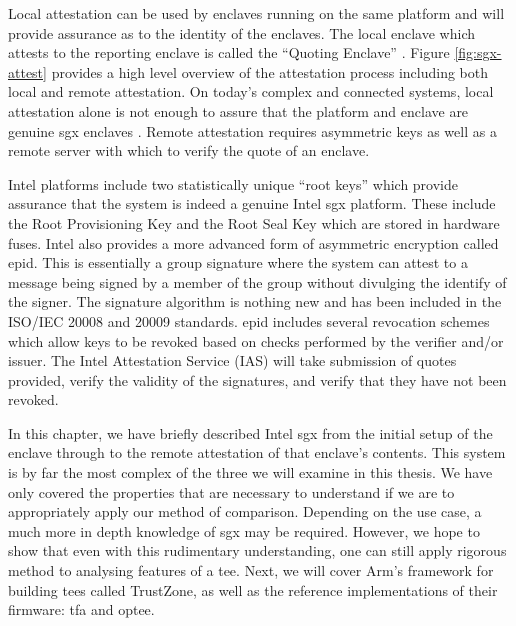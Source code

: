 Local attestation can be used by enclaves running on the same platform and will provide assurance as to the identity of the enclaves. The local enclave which attests to the reporting enclave is called the ``Quoting Enclave'' \cite{johnson2016intel}. Figure \ref{fig:sgx-attest} provides a high level overview of the attestation process including both local and remote attestation. On today's complex and connected systems, local attestation alone is not enough to assure that the platform and enclave are genuine \gls{sgx} enclaves \cite{knauth2018integrating}. Remote attestation requires asymmetric keys as well as a remote server with which to verify the quote of an enclave.

Intel platforms include two statistically unique ``root keys'' which provide assurance that the system is indeed a genuine Intel \gls{sgx} platform. These include the Root Provisioning Key and the Root Seal Key \cite{johnson2016intel} which are stored in hardware fuses. Intel also provides a more advanced form of asymmetric encryption called \gls{epid}. This is essentially a group signature where the system can attest to a message being signed by a member of the group without divulging the identify of the signer. The signature algorithm is nothing new \cite{brickell2007enhanced} and has been included in the ISO/IEC 20008 and 20009 standards. \gls{epid} includes several revocation schemes which allow keys to be revoked based on checks performed by the verifier and/or issuer. The Intel Attestation Service (IAS) will take submission of quotes provided, verify the validity of the signatures, and verify that they have not been revoked.

In this chapter, we have briefly described Intel \gls{sgx} from the initial setup of the enclave through to the remote attestation of that enclave's contents. This system is by far the most complex of the three we will examine in this thesis. We have only covered the properties that are necessary to understand if we are to appropriately apply our method of comparison. Depending on the use case, a much more in depth knowledge of \gls{sgx} may be required. However, we hope to show that even with this rudimentary understanding, one can still apply rigorous method to analysing features of a \gls{tee}. Next, we will cover Arm's framework for building \glspl{tee} called TrustZone, as well as the reference implementations of their firmware: \gls{tfa} and \gls{optee}.